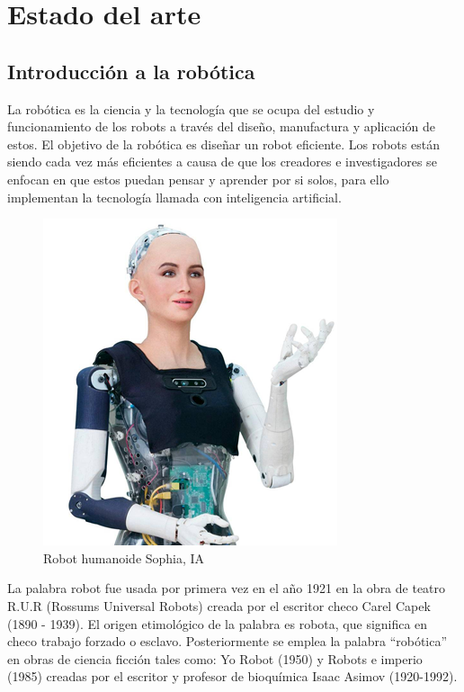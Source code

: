 \chapter{Estado del arte}\label{CAP2}


\section{Introducción a la robótica}
    La robótica es la ciencia y la tecnología que se ocupa del estudio y funcionamiento de los robots a través del diseño, manufactura y aplicación de estos. El objetivo de la robótica es diseñar un robot eficiente. Los robots están siendo cada vez más eficientes a causa de que los creadores e investigadores se enfocan en que estos puedan pensar y aprender por si solos, para ello implementan la tecnología llamada con inteligencia artificial.
    
    \begin{figure}[htb]
        \centering
        \includegraphics[width=0.4\linewidth]{Main/Chapter2/Images2/Robot-humanoideSophiaIA.png}
        \caption{Robot humanoide Sophia, IA}
        \label{f:Cap2_general_1}
    \end{figure}   
    
    La palabra robot fue usada por primera vez en el año 1921 en la obra de teatro R.U.R (Rossums Universal Robots) creada por el escritor checo Carel Capek (1890 - 1939). El origen etimológico de la palabra es robota, que significa en checo trabajo forzado o esclavo. Posteriormente se emplea la palabra ``robótica'' en obras de ciencia ficción tales como: Yo Robot (1950) y Robots e imperio (1985) creadas por el escritor y profesor de bioquímica Isaac Asimov (1920-1992).
    
    \newpage
    
